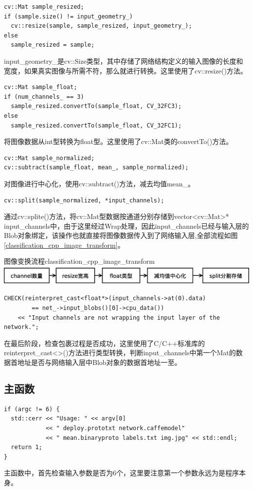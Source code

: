 \begin{verbatim}
cv::Mat sample_resized;
if (sample.size() != input_geometry_)
  cv::resize(sample, sample_resized, input_geometry_);
else
  sample_resized = sample;
\end{verbatim}
input\_geometry\_是cv::Size类型，其中存储了网络结构定义的输入图像的长度和宽度，如果真实图像与所需不符，那么就进行转换。这里使用了cv::resize()方法。

\begin{verbatim}
cv::Mat sample_float;
if (num_channels_ == 3)
  sample_resized.convertTo(sample_float, CV_32FC3);
else
  sample_resized.convertTo(sample_float, CV_32FC1);
\end{verbatim}
将图像数据从int型转换为float型。这里使用了cv::Mat类的convertTo()方法。

\begin{verbatim}
cv::Mat sample_normalized;
cv::subtract(sample_float, mean_, sample_normalized);
\end{verbatim}
对图像进行中心化，使用cv::subtract()方法，减去均值mean\_。

\begin{verbatim}
cv::split(sample_normalized, *input_channels);
\end{verbatim}
通过cv::splite()方法，将cv::Mat型数据按通道分别存储到vector<cv::Mat>* input\_channels中，由于这里经过Wrap处理，因此input\_channels已经与输入层的Blob对象绑定，该操作也就直接将图像数据传入到了网络输入层,全部流程如图\ref{classification_cpp_image_transform}。
\begin{cnfigure}{图像变换流程}{classification_cpp_image_transform}
  \includegraphics[height=1cm ,width=15cm,angle=0]{include/chp_from_examples/figures/classification_cpp_image_transform.eps}
\end{cnfigure}

\begin{verbatim}
CHECK(reinterpret_cast<float*>(input_channels->at(0).data)
        == net_->input_blobs()[0]->cpu_data())
    << "Input channels are not wrapping the input layer of the network.";
\end{verbatim}
在最后阶段，检查包裹过程是否成功，这里使用了C/C++标准库的reinterpret\_cast<>()方法进行类型转换，判断input\_channels中第一个Mat的数据首地址是否与网络输入层中Blob对象的数据首地址一至。


\subsection{主函数}
\begin{verbatim}
if (argc != 6) {
  std::cerr << "Usage: " << argv[0]
            << " deploy.prototxt network.caffemodel"
            << " mean.binaryproto labels.txt img.jpg" << std::endl;
  return 1;
}
\end{verbatim}
主函数中，首先检查输入参数是否为6个，这里要注意第一个参数永远为是程序本身。

